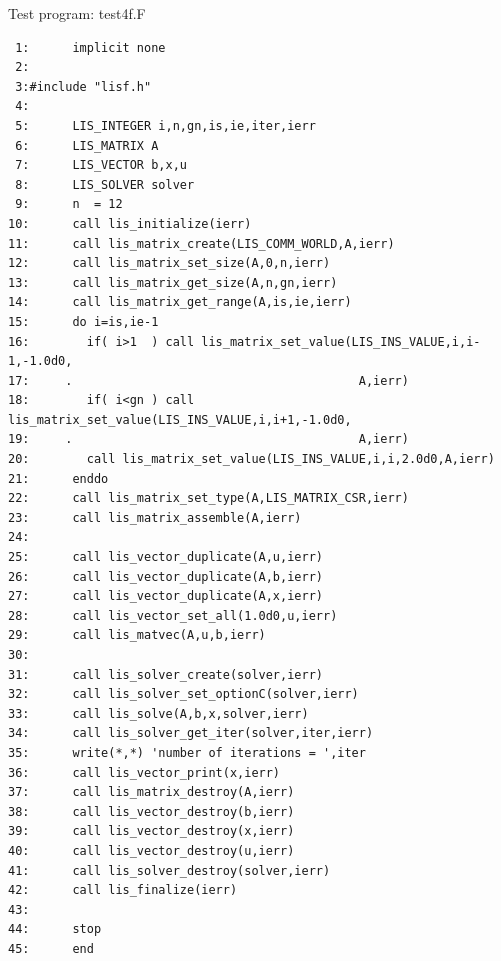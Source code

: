 \documentclass[a4paper]{article}
\begin{document}
\begin{itemsquarebox}[l]{Test program: test4f.F}
{\small
\begin{verbatim}
 1:      implicit none
 2:      
 3:#include "lisf.h"
 4:
 5:      LIS_INTEGER i,n,gn,is,ie,iter,ierr
 6:      LIS_MATRIX A
 7:      LIS_VECTOR b,x,u
 8:      LIS_SOLVER solver
 9:      n  = 12
10:      call lis_initialize(ierr)
11:      call lis_matrix_create(LIS_COMM_WORLD,A,ierr)
12:      call lis_matrix_set_size(A,0,n,ierr)
13:      call lis_matrix_get_size(A,n,gn,ierr)
14:      call lis_matrix_get_range(A,is,ie,ierr)
15:      do i=is,ie-1
16:        if( i>1  ) call lis_matrix_set_value(LIS_INS_VALUE,i,i-1,-1.0d0,
17:     .                                        A,ierr)
18:        if( i<gn ) call lis_matrix_set_value(LIS_INS_VALUE,i,i+1,-1.0d0,
19:     .                                        A,ierr)
20:        call lis_matrix_set_value(LIS_INS_VALUE,i,i,2.0d0,A,ierr)
21:      enddo
22:      call lis_matrix_set_type(A,LIS_MATRIX_CSR,ierr)
23:      call lis_matrix_assemble(A,ierr)
24:
25:      call lis_vector_duplicate(A,u,ierr)
26:      call lis_vector_duplicate(A,b,ierr)
27:      call lis_vector_duplicate(A,x,ierr)
28:      call lis_vector_set_all(1.0d0,u,ierr)
29:      call lis_matvec(A,u,b,ierr)
30:
31:      call lis_solver_create(solver,ierr)
32:      call lis_solver_set_optionC(solver,ierr)
33:      call lis_solve(A,b,x,solver,ierr)
34:      call lis_solver_get_iter(solver,iter,ierr)
35:      write(*,*) 'number of iterations = ',iter
36:      call lis_vector_print(x,ierr)
37:      call lis_matrix_destroy(A,ierr)
38:      call lis_vector_destroy(b,ierr)
39:      call lis_vector_destroy(x,ierr)
40:      call lis_vector_destroy(u,ierr)
41:      call lis_solver_destroy(solver,ierr)
42:      call lis_finalize(ierr)
43:
44:      stop
45:      end
\end{verbatim}
}
\end{itemsquarebox}

\newpage
\end{document}
